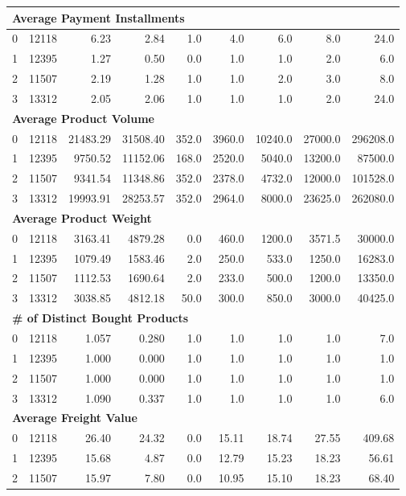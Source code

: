 \documentclass[a4paper,12pt]{article}
\begin{document}
\begin{longtable}{lrrrrrrrr}
\midrule
\multicolumn{9}{l}{\textbf{Average Payment Installments}} \\
\midrule
0 & 12118 & 6.23 & 2.84 & 1.0 & 4.0 & 6.0 & 8.0 & 24.0 \\
1 & 12395 & 1.27 & 0.50 & 0.0 & 1.0 & 1.0 & 2.0 & 6.0 \\
2 & 11507 & 2.19 & 1.28 & 1.0 & 1.0 & 2.0 & 3.0 & 8.0 \\
3 & 13312 & 2.05 & 2.06 & 1.0 & 1.0 & 1.0 & 2.0 & 24.0 \\
\midrule
\multicolumn{9}{l}{\textbf{Average Product Volume}} \\
\midrule
0 & 12118 & 21483.29 & 31508.40 & 352.0 & 3960.0 & 10240.0 & 27000.0 & 296208.0 \\
1 & 12395 & 9750.52 & 11152.06 & 168.0 & 2520.0 & 5040.0 & 13200.0 & 87500.0 \\
2 & 11507 & 9341.54 & 11348.86 & 352.0 & 2378.0 & 4732.0 & 12000.0 & 101528.0 \\
3 & 13312 & 19993.91 & 28253.57 & 352.0 & 2964.0 & 8000.0 & 23625.0 & 262080.0 \\
\midrule
\multicolumn{9}{l}{\textbf{Average Product Weight}} \\
\midrule
0 & 12118 & 3163.41 & 4879.28 & 0.0 & 460.0 & 1200.0 & 3571.5 & 30000.0 \\
1 & 12395 & 1079.49 & 1583.46 & 2.0 & 250.0 & 533.0 & 1250.0 & 16283.0 \\
2 & 11507 & 1112.53 & 1690.64 & 2.0 & 233.0 & 500.0 & 1200.0 & 13350.0 \\
3 & 13312 & 3038.85 & 4812.18 & 50.0 & 300.0 & 850.0 & 3000.0 & 40425.0 \\
\midrule
\multicolumn{9}{l}{\textbf{\# of Distinct Bought Products}} \\
\midrule
0 & 12118 & 1.057 & 0.280 & 1.0 & 1.0 & 1.0 & 1.0 & 7.0 \\
1 & 12395 & 1.000 & 0.000 & 1.0 & 1.0 & 1.0 & 1.0 & 1.0 \\
2 & 11507 & 1.000 & 0.000 & 1.0 & 1.0 & 1.0 & 1.0 & 1.0 \\
3 & 13312 & 1.090 & 0.337 & 1.0 & 1.0 & 1.0 & 1.0 & 6.0 \\
\midrule
\multicolumn{9}{l}{\textbf{Average Freight Value}} \\
\midrule
0 & 12118 & 26.40 & 24.32 & 0.0 & 15.11 & 18.74 & 27.55 & 409.68 \\
1 & 12395 & 15.68 & 4.87 & 0.0 & 12.79 & 15.23 & 18.23 & 56.61 \\
2 & 11507 & 15.97 & 7.80 & 0.0 & 10.95 & 15.10 & 18.23 & 68.40 \\

\end{longtable}
\end{document}
